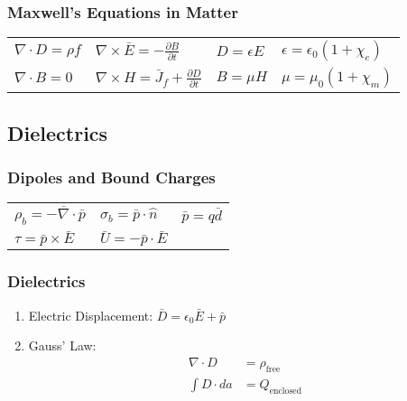 \documentclass[10pt,letter]{article}
\begin{document}
\subsubsection{Maxwell's Equations in Matter}
\begin{tabular}{l l l l}
    $\nabla \cdot D = \rho f$ & $\nabla \times \bar{E} = -\frac{\partial B}{\partial t}$ & $D = \epsilon E$ & $\epsilon = \epsilon_0(1 + \chi_e)$\\
    $\nabla \cdot B = 0$ & $\nabla \times H = \bar{J}_f + \frac{\partial D}{\partial t}$ & $B = \mu H$ & $\mu = \mu_0(1  +\chi_m)$
\end{tabular}

\subsection{Dielectrics}
\subsubsection{Dipoles and Bound Charges}
\begin{tabular}{l l l}
$\rho_b = - \overline{\nabla} \cdot \bar{p}$ & $\sigma_b = \bar{p} \cdot \hat{n}$ & $\bar{p} = q \bar{d}$\\
$\tau = \bar{p} \times \bar{E} $ & $\bar{U} = -\bar{p} \cdot \bar{E}$ & 
\end{tabular}

\subsubsection{Dielectrics}
\begin{enumerate}
    \item Electric Displacement: $\bar{D} = \epsilon_0 \bar{E} + \bar{p}$
    \item Gauss' Law: \\
    \begin{align}
      \nabla \cdot D &= \rho_\textrm{free}\\
      \int D \cdot da &= Q_{\textrm{enclosed}}
    \end{align}
\end{enumerate}
\end{document}
